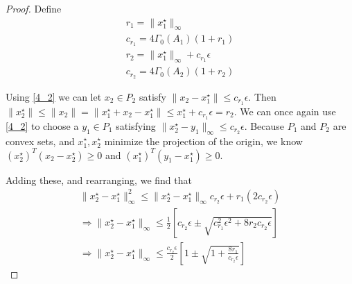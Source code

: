 \documentclass{article}
\theoremstyle{case}
\numberwithin{theorem}{subsection}
\newcommand{\huff}{{\Gamma_0}}
\begin{document}
\begin{proof}
Define
\begin{align*}
r_1 = \|x_1^{\star}\|_{\infty} \\
c_{r_1} = 4\huff(A_1)\left(1 + r_1\right) \\
r_2 =  \|x_1^{\star}\|_{\infty} + c_{r_1}\epsilon \\
c_{r_2}=  4\huff(A_2)\left(1 + r_2\right)
\end{align*}

Using \cref{4_2} we can let $x_2 \in P_2$ satisfy $\|x_2 - x_1^{\star}\| \le c_{r_1}\epsilon$.
Then
$\|x_2^{\star}\| \le \|x_2\| = \|x_1^{\star} + x_2 - x_1^{\star}\| \le x_1^{\star} + c_{r_1}\epsilon = r_2$.
We can once again use \cref{4_2} to choose a $y_1 \in P_1$ satisfying $\|x_2^{\star} - y_1\|_{\infty} \le c_{r_2}\epsilon$.
Because $P_1$ and $P_2$ are convex sets, and $x_1^{\star}, x_2^{\star}$ minimize the projection of the origin, we know
$\left(x_2^{\star}\right)^T \left(x_2 - x_2^{\star}\right)\ge 0$ and
$\left(x_1^{\star}\right)^T \left(y_1 - x_1^{\star}\right)\ge 0$.

Adding these, and rearranging, we find that
\begin{align*}
\|x_2^{\star} - x_1^{\star}\|_{\infty}^2 \le \|x_2^{\star} - x_1^{\star}\|_{\infty} c_{r_2}\epsilon + r_1(2c_{r_2}\epsilon) \\
\Longrightarrow \|x_2^{\star} - x_1^{\star}\|_{\infty} \le \frac 1 2 \left[c_{r_2}\epsilon \pm \sqrt{c_{r_1}^2\epsilon^2 + 8r_2c_{r_2}\epsilon}\right] \\
\Longrightarrow \|x_2^{\star} - x_1^{\star}\|_{\infty} \le \frac {c_{r_2}\epsilon} 2 \left[1 \pm \sqrt{1 + \frac{8r_1}{c_{r_2}\epsilon}}\right] 
\end{align*}


\end{proof}
\end{document}

